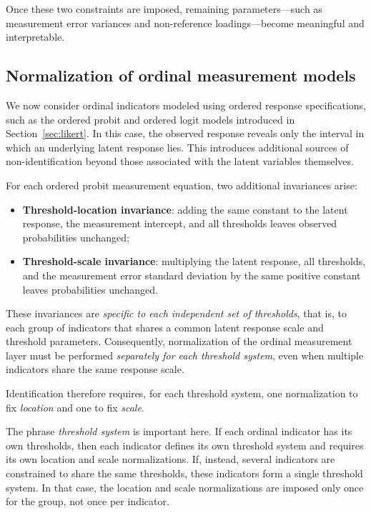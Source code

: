 \documentclass[12pt,a4paper]{article}
\begin{document}
Once these two constraints are imposed, remaining parameters—such as
measurement error variances and non-reference loadings—become
meaningful and interpretable.

\subsection{Normalization of ordinal measurement models}

We now consider ordinal indicators modeled using ordered response
specifications, such as the ordered probit and ordered logit models
introduced in Section~\ref{sec:likert}. In this
case, the observed response reveals only the interval in which an
underlying latent response lies. This introduces additional sources of
non-identification beyond those associated with the latent variables
themselves.

For each ordered probit measurement equation, two additional
invariances arise:
\begin{itemize}
  \item \textbf{Threshold-location invariance}: adding the same
    constant to the latent response, the measurement intercept, and
    all thresholds leaves observed probabilities unchanged;
  \item \textbf{Threshold-scale invariance}: multiplying the latent
    response, all thresholds, and the measurement error standard
    deviation by the same positive constant leaves probabilities
    unchanged.
\end{itemize}

 These invariances are \emph{specific to each independent set of
 thresholds}, that is, to each group of indicators that shares a
 common latent response scale and threshold parameters.  Consequently,
 normalization of the ordinal measurement layer must be performed
 \emph{separately for each threshold system}, even when multiple
 indicators share the same response scale.

Identification therefore requires, for each threshold system, one
normalization to fix \emph{location} and one to fix \emph{scale}.

The phrase \emph{threshold system} is important here. If each ordinal
indicator has its own thresholds, then each indicator defines its own
threshold system and requires its own location and scale
normalizations. If, instead, several indicators are constrained to
share the same thresholds, these indicators form a single threshold
system. In that case, the location and scale normalizations are imposed
only once for the group, not once per indicator.
\end{document}
